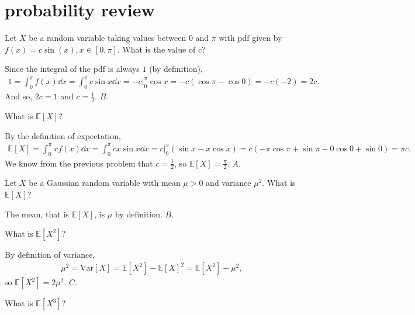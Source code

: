 \documentclass[a4paper]{article}
\begin{document}
\section{probability review}
\begin{Exercise}
	Let $X$ be a random variable taking values between $0$ and $\pi$ with pdf given by $f(x) = c\sin(x), x \in [0, \pi].$ What is the value of $c$?
\end{Exercise}
\begin{Solution}
	Since the integral of the pdf is always $1$ (by definition),
	\begin{align*}
		1 = \int_{0}^{\pi} f(x) \dd{x} = \int_{0}^{\pi} c \sin x \dd{x} = -c \Big|_{0}^{\pi} \cos x = -c (\cos \pi - \cos 0) = -c (-2) = 2c. 
	\end{align*}
	And so, $2c = 1$ and $c = \frac{1}{2}$. $\boxed{B}$.
\end{Solution}
\begin{Exercise}
	What is $\mathbb{E}[X]$?
\end{Exercise}
\begin{Solution}
	By the definition of expectation, 
	\begin{align*}
		\mathbb{E}[X] = \int_{0}^{\pi} x f(x) \dd{x} = \int_0^{\pi} c x \sin x \dd{x} = c \Big|_0^{\pi} \left( \sin x - x \cos x \right) = c (-\pi \cos \pi + \sin \pi - 0 \cos 0 + \sin 0) = \pi c.
	\end{align*}
	We know from the previous problem that $c = \frac{1}{2}$, so $\mathbb{E}[X] = \frac{\pi}{2}.$ $\boxed{A}$.
\end{Solution}
\begin{Exercise}
	Let $X$ be a Gaussian random variable with mean $\mu >0$ and variance $\mu^2$. What is $\mathbb{E}[X]$?
\end{Exercise}
\begin{Solution}
	The mean, that is $\mathbb{E}[X]$, is $\mu$ by definition. $\boxed{B}$.
\end{Solution}
\begin{Exercise}
	What is $\mathbb{E}[X^2]$?
\end{Exercise}
\begin{Solution}
	By definition of variance,
	\begin{align*}
		\mu^2 = \text{Var}[X] = \mathbb{E}[X^2] - \mathbb{E}[X]^2 = \mathbb{E}[X^2] - \mu^2,
	\end{align*}
	so $\mathbb{E}[X^2] = 2 \mu^2.$ $\boxed{C}$.
\end{Solution}
\begin{Exercise}
	What is $\mathbb{E}[X^3]$?
\end{Exercise}
\end{document}
